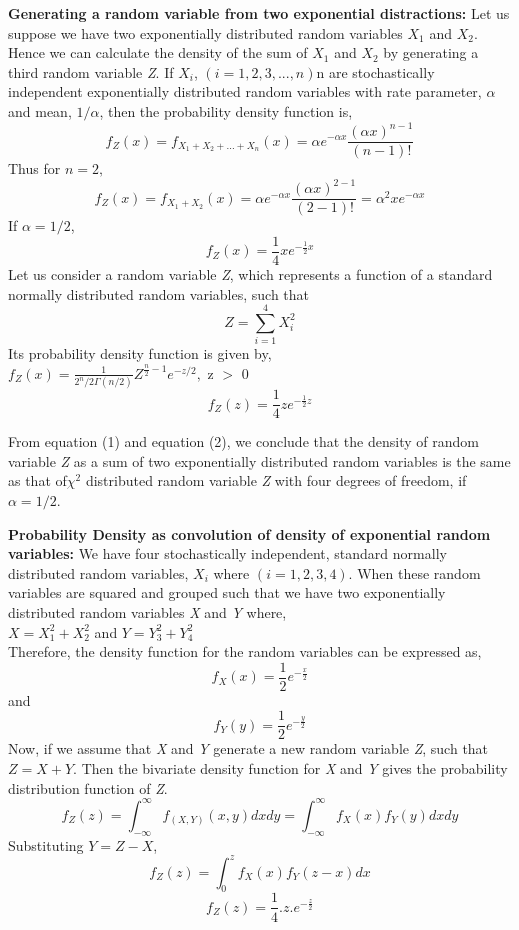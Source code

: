 \noindent \textbf{Generating a random variable from two exponential distractions:}
\noindent Let us suppose we have two exponentially distributed random variables $X_1$ and $X_2$. Hence we can calculate the density of the sum of $X_1$ and $X_2$ by generating a third random variable \textit{Z}. If $X_i$, $(i = 1, 2, 3,...,n)$n are stochastically independent exponentially distributed random variables with rate parameter, $\alpha$ and mean, $1/\alpha$, then the probability density function is,
$$ f_Z(x) = f_{X_1 + X_2 + ... + X_n}(x) = \alpha e^{-\alpha x} \frac{(\alpha x)^{n-1}}{(n-1)!}      $$
\noindent Thus for $n = 2,$
$$ f_Z(x) = f_{X_1 + X_2 }(x) = \alpha e^{-\alpha x} \frac{(\alpha x)^{2-1}}{(2-1)!} = \alpha^2 x e^{-\alpha x}      $$
\noindent If $\alpha = 1/2$,
\[ f_Z(x) = \frac{1}{4}x e^{-\frac{1}{2}x} \tag{1} \]
\noindent Let us consider a random variable \textit{Z}, which represents a function of a standard normally distributed random variables, such that\\
$$ Z = \sum \limits_{i=1}^{4} X_i^2 $$
\noindent Its probability density function is given by, \\
$ f_Z(x) = \frac{1}{2^n / 2 \Gamma (n/2)} Z^{\frac{n}{2} - 1} e^{-z/2} ,$ \: \: z $>$ 0
\[ f_Z(z) = \frac{1}{4} z e^{-\frac{1}{2}z}   \tag{2} \]

\noindent From equation (1) and equation (2), we conclude that the density of random variable \textit{Z} as a sum of two exponentially distributed random variables is the same as that of$\chi^2$ distributed random variable \textit{Z} with four degrees of freedom, if $\alpha = 1/2$.


\noindent \textbf{Probability Density as convolution of density of exponential random variables:}
\noindent We have four stochastically independent, standard normally distributed random variables, $X_i$ where $(i = 1, 2, 3, 4)$. When these random variables are squared and grouped such that we have two exponentially distributed random variables \textit{X} and \textit{Y} where,\\
$ X = X_1^2 + X_2^2 $ and $ Y = Y_3^2 + Y_4^2 $ \\
\noindent Therefore, the density function for the random variables can be expressed as,
$$ f_X(x) =  \frac{1}{2} e^{-\frac{x}{2}}$$
\noindent and
$$ f_Y(y) =  \frac{1}{2} e^{-\frac{y}{2}}$$
\noindent Now, if we assume that \textit{X} and \textit{Y} generate a new random variable \textit{Z}, such that $Z = X + Y$. Then the bivariate density function for \textit{X} and \textit{Y} gives the probability distribution function of  \textit{Z}.
$$f _Z(z) = \int_{-\infty}^{\infty} f_{(X, Y)}(x, y) \textit{dx}  \textit{dy} = \int_{-\infty}^{\infty} f_{X}(x)  f_{Y}(y) \textit{dx}  \textit{dy}$$
\noindent Substituting $Y = Z - X$,
$$f_Z(z) = \int_0^z f_X(x)f_Y(z - x) dx $$
$$f_Z(z) =  \frac{1}{4}. z. e^{-\frac{z}{2}}$$




